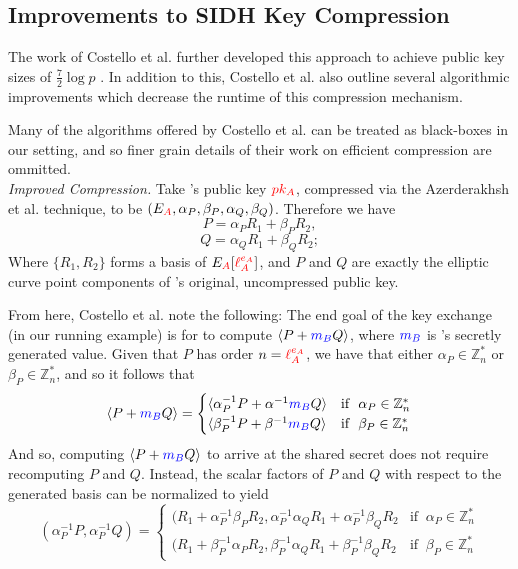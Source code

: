 \subsection{Improvements to SIDH Key Compression}
\label{subsec:costcompression}

The work of Costello et al. further developed this approach to achieve public key sizes of $\frac{7}{2}\log p$ \cite{pkcomp}. In addition to this, Costello et al. also outline several algorithmic improvements which decrease the runtime of this compression mechanism.

Many of the algorithms offered by Costello et al. can be treated as black-boxes in our setting, and so finer grain details of their work on efficient compression are ommitted.\\

\noindent
\textit{Improved Compression.} Take \alice's public key $\textcolor{red}{pk_A}$, compressed via the Azerderakhsh et al. technique, to be $(E_{\textcolor{red}{A}}, \alpha_{P}, \beta_{P}, \alpha_{Q}, \beta_{Q})$. Therefore we have
$$
P = \alpha_{P}R_1 + \beta_{P}R_2,
$$
$$
Q = \alpha_{Q}R_1 + \beta_{Q}R_2;
$$
Where $\{R_1, R_2\}$ forms a basis of $E_{\textcolor{red}{A}}[\textcolor{red}{\ell_{A}^{e_A}}]$, and $P$ and $Q$ are exactly the elliptic curve point components of \alice's original, uncompressed public key.

From here, Costello et al. note the following: The end goal of the key exchange (in our running example) is for \bob to compute $\langle P + \textcolor{blue}{m_B} Q\rangle$, where $\textcolor{blue}{m_B}$ is \bob's secretly generated value. Given that $P$ has order $n = \textcolor{red}{\ell_{A}^{e_A}}$, we have that either $\alpha_{P} \in \mathbb{Z}^{*}_{n}$ or $\beta_{P} \in \mathbb{Z}^{*}_{n}$, and so it follows that
$$
\langle P + \textcolor{blue}{m_B} Q \rangle =  \begin{cases}
							\langle \alpha^{-1}_{P}P + \alpha^{-1}\textcolor{blue}{m_B} Q \rangle & \text{if }\ \alpha_{P} \in \mathbb{Z}^{*}_{n}\\
							\langle \beta^{-1}_{P}P + \beta^{-1}\textcolor{blue}{m_B} Q \rangle & \text{if }\ \beta_{P} \in \mathbb{Z}^{*}_{n}
							\end{cases}
$$
And so, computing $\langle P + \textcolor{blue}{m_B} Q\rangle$ to arrive at the shared secret does not require recomputing $P$ and $Q$. Instead, the scalar factors of $P$ and $Q$ with respect to the generated basis can be normalized to yield
$$
(\alpha^{-1}_{P}P, \alpha^{-1}_{P}Q) = \begin{cases}
							(R_{1} + \alpha^{-1}_{P}\beta_{P} R_{2}, \alpha^{-1}_{P}\alpha_{Q}R_{1} + \alpha^{-1}_{P}\beta_{Q}R_{2}  & \text{if }\ \alpha_{P} \in \mathbb{Z}^{*}_{n}\\
							(R_{1} + \beta^{-1}_{P}\alpha_{P} R_{2}, \beta^{-1}_{P}\alpha_{Q}R_{1} + \beta^{-1}_{P}\beta_{Q}R_{2} & \text{if }\ \beta_{P} \in \mathbb{Z}^{*}_{n}
						   	\end{cases}
$$

